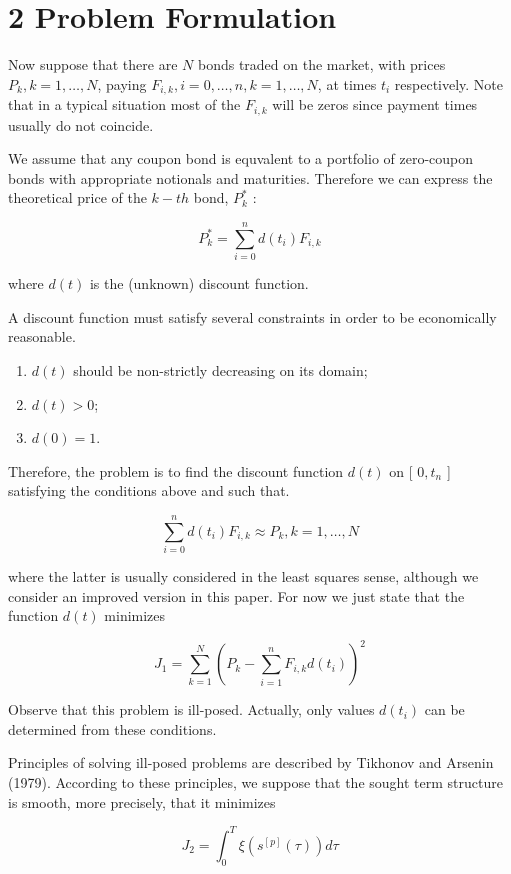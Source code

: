\documentclass[10pt]{article}
\begin{document}
\section*{2 Problem Formulation}
Now suppose that there are $N$ bonds traded on the market, with prices $P_{k}, k=1, \ldots, N$, paying $F_{i, k}, i=0, \ldots, n, k=1, \ldots, N$, at times $t_{i}$ respectively. Note that in a typical situation most of the $F_{i, k}$ will be zeros since payment times usually do not coincide.

We assume that any coupon bond is equvalent to a portfolio of zero-coupon bonds with appropriate notionals and maturities. Therefore we can express the theoretical price of the $k-t h$ bond, $P_{k}^{*}$ :

$$
P_{k}^{*}=\sum_{i=0}^{n} d\left(t_{i}\right) F_{i, k}
$$

where $d(t)$ is the (unknown) discount function.

A discount function must satisfy several constraints in order to be economically reasonable.

\begin{enumerate}
  \item $d(t)$ should be non-strictly decreasing on its domain;
  \item $d(t)>0$;
  \item $d(0)=1$.
\end{enumerate}

Therefore, the problem is to find the discount function $d(t)$ on [ $0, t_{n}$ ] satisfying the conditions above and such that.

$$
\sum_{i=0}^{n} d\left(t_{i}\right) F_{i, k} \approx P_{k}, k=1, \ldots, N
$$

where the latter is usually considered in the least squares sense, although we consider an improved version in this paper. For now we just state that the function $d(t)$ minimizes

$$
J_{1}=\sum_{k=1}^{N}\left(P_{k}-\sum_{i=1}^{n} F_{i, k} d\left(t_{i}\right)\right)^{2}
$$

Observe that this problem is ill-posed. Actually, only values $d\left(t_{i}\right)$ can be determined from these conditions.

Principles of solving ill-posed problems are described by Tikhonov and Arsenin (1979). According to these principles, we suppose that the sought term structure is smooth, more precisely, that it minimizes

$$
J_{2}=\int_{0}^{T} \xi\left(s^{[p]}(\tau)\right) d \tau
$$
\end{document}
